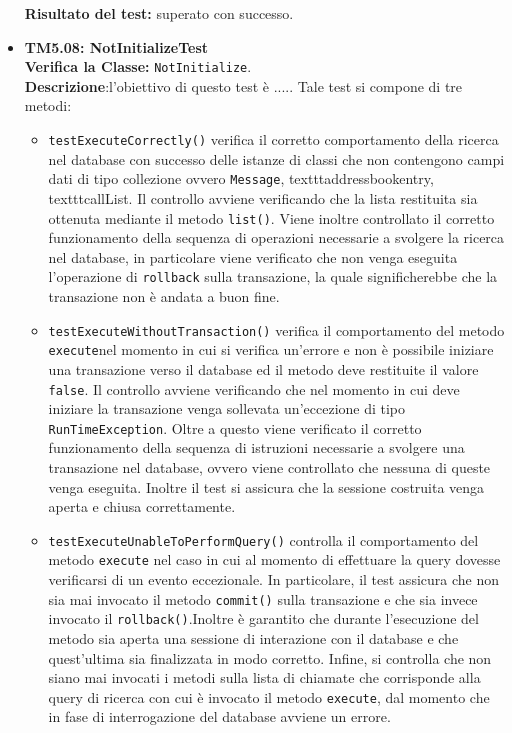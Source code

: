 \begin{itemize}
\begin{itemize}
\end{itemize}
\textbf{Risultato del test:} superato con successo.




\item \textbf{TM5.08: NotInitializeTest}\\
\textbf{Verifica la Classe:} \texttt{NotInitialize}.\\
\textbf{Descrizione}:l'obiettivo di questo test è .....
Tale test si compone di tre metodi:
\begin{itemize}
\item \texttt{testExecuteCorrectly()} 
verifica il corretto comportamento della ricerca nel database con successo delle istanze di classi che non contengono campi dati di tipo collezione ovvero \texttt{Message}, texttt{addressbookentry}, texttt{callList}.  
Il controllo avviene verificando che la lista restituita sia ottenuta mediante il metodo \texttt{list()}. 
Viene inoltre controllato il corretto funzionamento della sequenza di operazioni necessarie a svolgere la ricerca nel database, in particolare viene verificato che non venga eseguita l'operazione di \texttt{rollback} sulla transazione, la quale significherebbe che la transazione non è andata a buon fine.


\item \texttt{testExecuteWithoutTransaction()} verifica il comportamento del metodo \texttt{execute}nel momento in cui si verifica un'errore e non è possibile iniziare una transazione verso il database ed il metodo deve restituite il valore \texttt{false}. Il controllo avviene verificando che nel momento in cui deve iniziare la transazione venga sollevata un'eccezione di tipo \texttt{RunTimeException}. Oltre a questo viene verificato il corretto funzionamento della sequenza di istruzioni necessarie a svolgere una transazione nel database, ovvero viene controllato che nessuna di queste venga eseguita. Inoltre il test si assicura che la sessione costruita venga aperta e chiusa correttamente.

\item \texttt{testExecuteUnableToPerformQuery()} controlla il comportamento del metodo \texttt{execute} nel caso in cui al momento di effettuare la query dovesse verificarsi di un evento eccezionale. In particolare, il test assicura che non sia mai invocato il metodo \texttt{commit()} sulla transazione e che sia invece invocato il \texttt{rollback()}.Inoltre è garantito che durante l'esecuzione del metodo sia aperta una sessione di interazione con il database e che quest'ultima sia finalizzata in modo corretto. Infine, si controlla che non siano mai invocati i metodi sulla lista di chiamate che corrisponde alla query di ricerca con cui è invocato il metodo \texttt{execute}, dal momento che in fase di interrogazione del database avviene un errore.



\end{itemize}
\end{itemize}
